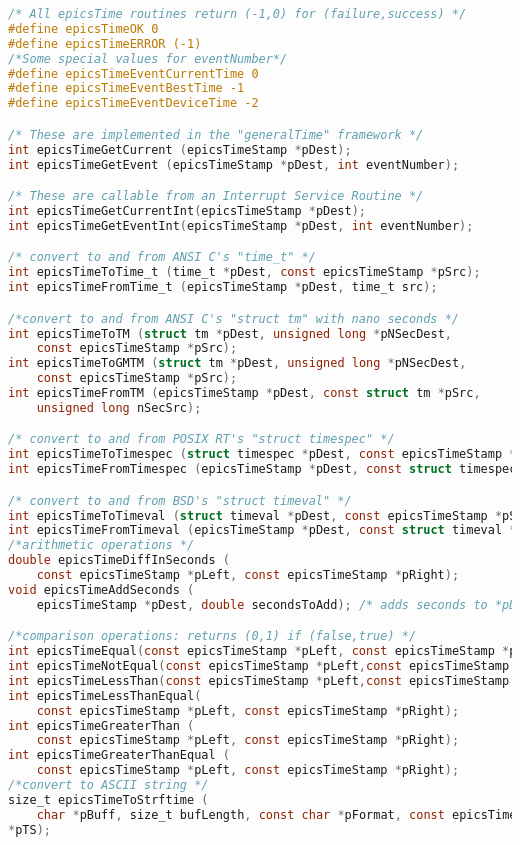 \begin{lstlisting}[language=C]
/* All epicsTime routines return (-1,0) for (failure,success) */
#define epicsTimeOK 0
#define epicsTimeERROR (-1)
/*Some special values for eventNumber*/
#define epicsTimeEventCurrentTime 0
#define epicsTimeEventBestTime -1
#define epicsTimeEventDeviceTime -2

/* These are implemented in the "generalTime" framework */
int epicsTimeGetCurrent (epicsTimeStamp *pDest);
int epicsTimeGetEvent (epicsTimeStamp *pDest, int eventNumber);

/* These are callable from an Interrupt Service Routine */
int epicsTimeGetCurrentInt(epicsTimeStamp *pDest);
int epicsTimeGetEventInt(epicsTimeStamp *pDest, int eventNumber);

/* convert to and from ANSI C's "time_t" */
int epicsTimeToTime_t (time_t *pDest, const epicsTimeStamp *pSrc);
int epicsTimeFromTime_t (epicsTimeStamp *pDest, time_t src);

/*convert to and from ANSI C's "struct tm" with nano seconds */
int epicsTimeToTM (struct tm *pDest, unsigned long *pNSecDest,
    const epicsTimeStamp *pSrc);
int epicsTimeToGMTM (struct tm *pDest, unsigned long *pNSecDest,
    const epicsTimeStamp *pSrc);
int epicsTimeFromTM (epicsTimeStamp *pDest, const struct tm *pSrc,
    unsigned long nSecSrc);

/* convert to and from POSIX RT's "struct timespec" */
int epicsTimeToTimespec (struct timespec *pDest, const epicsTimeStamp *pSrc);
int epicsTimeFromTimespec (epicsTimeStamp *pDest, const struct timespec *pSrc);

/* convert to and from BSD's "struct timeval" */
int epicsTimeToTimeval (struct timeval *pDest, const epicsTimeStamp *pSrc);
int epicsTimeFromTimeval (epicsTimeStamp *pDest, const struct timeval *pSrc);
/*arithmetic operations */
double epicsTimeDiffInSeconds (
    const epicsTimeStamp *pLeft, const epicsTimeStamp *pRight);
void epicsTimeAddSeconds (
    epicsTimeStamp *pDest, double secondsToAdd); /* adds seconds to *pDest */

/*comparison operations: returns (0,1) if (false,true) */
int epicsTimeEqual(const epicsTimeStamp *pLeft, const epicsTimeStamp *pRight);
int epicsTimeNotEqual(const epicsTimeStamp *pLeft,const epicsTimeStamp *pRight);
int epicsTimeLessThan(const epicsTimeStamp *pLeft,const epicsTimeStamp *pRight);
int epicsTimeLessThanEqual(
    const epicsTimeStamp *pLeft, const epicsTimeStamp *pRight);
int epicsTimeGreaterThan (
    const epicsTimeStamp *pLeft, const epicsTimeStamp *pRight);
int epicsTimeGreaterThanEqual (
    const epicsTimeStamp *pLeft, const epicsTimeStamp *pRight);
/*convert to ASCII string */
size_t epicsTimeToStrftime (
    char *pBuff, size_t bufLength, const char *pFormat, const epicsTimeStamp 
*pTS);


\end{lstlisting}
